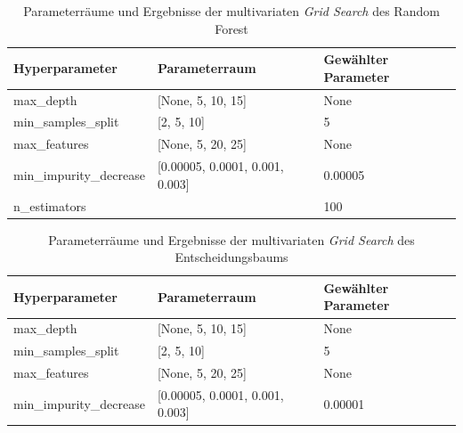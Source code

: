 \begin{table}[h]
		\centering
\begin{tabular}{lll}
	\hline
	Hyperparameter          & Parameterraum                       & Gewählter Parameter \\ \hline
	max\_depth              & {[}None, 5, 10, 15{]}               & None                \\
	min\_samples\_split     & {[}2, 5, 10{]}                      & 5                   \\
	max\_features           & {[}None, 5, 20, 25{]}               & None                \\
	min\_impurity\_decrease & {[}0.00005, 0.0001, 0.001, 0.003{]} & 0.00005             \\ 
	n\_estimators &  & 100 \\ \hline
\end{tabular}
	\caption{\label{table:parameter_grid_multivariat_forest} Parameterräume und Ergebnisse der multivariaten \emph{Grid Search} des Random Forest}
\end{table}


\begin{table}[]
	\centering
	\begin{tabular}{lll}
	\hline
	Hyperparameter          & Parameterraum                       & Gewählter Parameter \\ \hline
	max\_depth              & {[}None, 5, 10, 15{]}               & None                \\
	min\_samples\_split     & {[}2, 5, 10{]}                      & 5                   \\
	max\_features           & {[}None, 5, 20, 25{]}               & None                \\
	min\_impurity\_decrease & {[}0.00005, 0.0001, 0.001, 0.003{]} & 0.00001             \\ \hline
\end{tabular}
	\caption{\label{table:parameter_grid_multivariat_tree} Parameterräume und Ergebnisse der multivariaten \emph{Grid Search} des Entscheidungsbaums}
\end{table}

